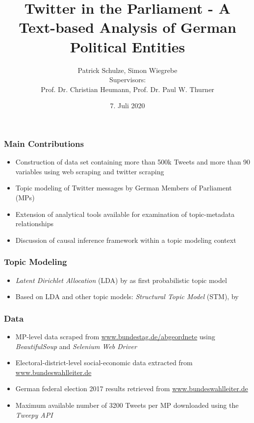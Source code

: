 \documentclass[xcolor=dvipsnames]{beamer}
\title{Twitter in the Parliament - A Text-based Analysis of German Political Entities}
\date{7. Juli 2020}
\author[author1]{Patrick Schulze, Simon Wiegrebe\\[10mm]{\small Supervisors:\\ Prof. Dr. Christian Heumann, Prof. Dr. Paul W. Thurner}}
\begin{document}
\begin{frame}
\titlepage
\end{frame}


\section{}
\begin{frame}
\frametitle{Main Contributions}
\begin{itemize}
\item Construction of data set containing more than 500k Tweets and more than 90 variables using web scraping and twitter scraping
\item Topic modeling of Twitter messages by German Members of Parliament (MPs)
\item Extension of analytical tools available for examination of topic-metadata relationships 
\item Discussion of causal inference framework within a topic modeling context
\end{itemize}
\end{frame}

\begin{frame}
\frametitle{Topic Modeling}
\begin{itemize}
\item \textit{Latent Dirichlet Allocation} (LDA) by \textcite{blei2003latent} as first probabilistic topic model
\item Based on LDA and other topic models: \textit{Structural Topic Model} (STM), by \textcite{roberts2016model}
\end{itemize}
\end{frame}

\begin{frame}
\frametitle{Data}
\begin{itemize}
\item MP-level data scraped from \url{www.bundestag.de/abgeordnete} using \textit{BeautifulSoup} and \textit{Selenium Web Driver}
\item Electoral-district-level social-economic data extracted from \url{www.bundeswahlleiter.de}
\item German federal election 2017 results retrieved from \url{www.bundeswahlleiter.de}
\item Maximum available number of 3200 Tweets per MP downloaded using the \textit{Tweepy API}
\end{itemize}
\end{frame}
\end{document}
